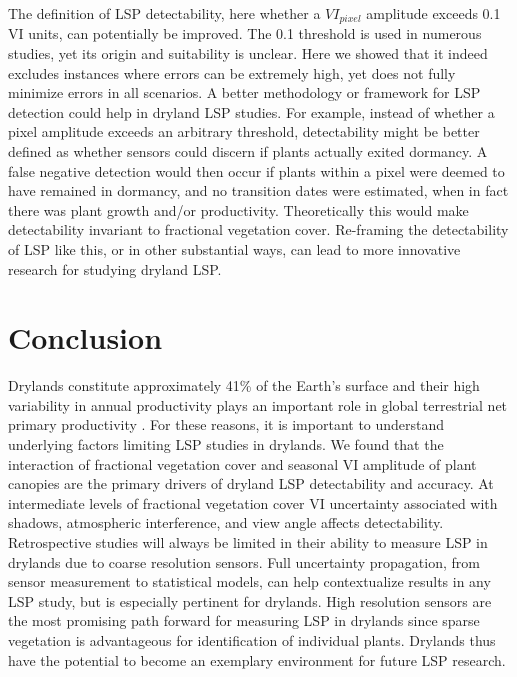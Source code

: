 \documentclass{article}
\begin{document}
The definition of LSP detectability, here whether a $VI_{pixel}$ amplitude exceeds 0.1 VI units, can potentially be improved. The 0.1 threshold is used in numerous studies, yet its origin and suitability is unclear. Here we showed that it indeed excludes instances where errors can be extremely high, yet does not fully minimize errors in all scenarios. A better methodology or framework for LSP detection could help in dryland LSP studies. For example, instead of whether a pixel amplitude exceeds an arbitrary threshold, detectability might be better defined as whether sensors could discern if plants actually exited dormancy. A false negative detection would then occur if plants within a pixel were deemed to have remained in dormancy, and no transition dates were estimated, when in fact there was plant growth and/or productivity. Theoretically this would make detectability invariant to fractional vegetation cover. Re-framing the detectability of LSP like this, or in other substantial ways, can lead to more innovative research for studying dryland LSP.


\section{Conclusion}

Drylands constitute approximately 41\% of the Earth’s surface \cite{hoover2020} and their high variability in annual productivity plays an important role in global terrestrial net primary productivity \cite{ahlstrom2015}. For these reasons, it is important to understand underlying factors limiting LSP studies in drylands. We found that the interaction of fractional vegetation cover and seasonal VI amplitude of plant canopies are the primary drivers of dryland LSP detectability and accuracy. At intermediate levels of fractional vegetation cover VI uncertainty associated with shadows, atmospheric interference, and view angle affects detectability. Retrospective studies will always be limited in their ability to measure LSP in drylands due to coarse resolution sensors. Full uncertainty propagation, from sensor measurement to statistical models, can help contextualize results in any LSP study, but is especially pertinent for drylands. High resolution sensors are the most promising path forward for measuring LSP in drylands since sparse vegetation is advantageous for identification of individual plants. Drylands thus have the potential to become an exemplary environment for future LSP research. 
\end{document}
